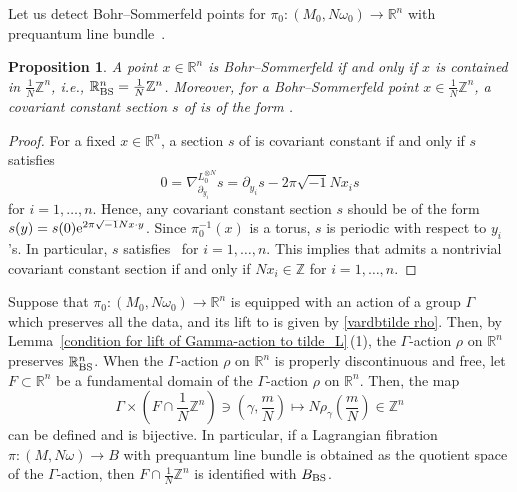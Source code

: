 \documentclass[pdftex]{sigma}
\numberwithin{equation}{section}
\newtheorem{Proposition}[Theorem]{Proposition}
 { \theoremstyle{definition}
\newtheorem{Definition}[Theorem]{Definition}
\newtheorem{Note}[Theorem]{Note}
\newtheorem{Example}[Theorem]{Example}
\newtheorem{Remark}[Theorem]{Remark} }
\newcommand{\R}{\mathbb{R}}
\newcommand{\Z}{\mathbb{Z}}
\renewcommand{\tilde}{\widetilde}
\newcommand{\vardbtilde}[1]{\tilde{\raisebox{0pt}[0.85\height]{$\tilde{#1}$}}}
\begin{document}
Let us detect Bohr--Sommerfeld points for $\pi_0\colon (M_0,N\omega_0)\to \R^n$ with prequantum line bundle~.
\begin{Proposition}\label{BS}
A point $x\in \R^n$ is Bohr--Sommerfeld if and only if $x$ is contained in $\frac{1}{N}\Z^n$, i.e., $\R^n_{\rm BS}=\frac{1}{N}\Z^n$. Moreover, for a Bohr--Sommerfeld point $x\in \frac{1}{N}\Z^n$, a covariant constant section $s$ of  is of the form .
\end{Proposition}
\begin{proof}
For a fixed $x\in \R^n$, a section $s$ of  is covariant constant if and only if $s$ satisfies
\[
0=\nabla^{L_0^{\otimes N}}_{\partial_{y_i}}s=\partial_{y_i}s-2\pi\sqrt{-1}Nx_is
\]
for $i=1,\ldots , n$. Hence, any covariant constant section $s$ should be of the form $s(y)=\smash{s(0){\rm e}^{2\pi\sqrt{-1}Nx\cdot y}}$. Since $\pi_0^{-1}(x)$ is a torus, $s$ is periodic with respect to $y_i$'s. In particular, $s$ satisfies~ for $i=1,\ldots , n$. This implies that  admits a nontrivial covariant constant section if and only if $Nx_i\in \Z$ for $i=1,\ldots , n$.
\end{proof}

\begin{Remark}\label{action preserves BS}
Suppose that $\pi_0\colon (M_0,N\omega_0)\to \R^n$ is equipped with an action of a group $\Gamma$ which preserves all the data, and its lift \smash{$\vardbtilde \rho$} to  is given by \eqref{vardbtilde rho}. Then, by Lemma~\ref{condition for lift of Gamma-action to tilde_L}\,(1), the $\Gamma$-action $\rho$ on $\R^n$ preserves $\R^n_{\rm BS}$. When the $\Gamma$-action $\rho$ on $\R^n$ is properly discontinuous and free, let $F\subset \R^n$ be a fundamental domain of the $\Gamma$-action $\rho$ on $\R^n$. Then, the map
\begin{equation}\label{Gamma times F}
\Gamma\times \left(F\cap \frac{1}{N}\Z^n\right)\ni \left(\gamma ,\dfrac{m}{N}\right)\mapsto N\rho_\gamma \left(\dfrac{m}{N}\right)\in \Z^n
\end{equation}
can be defined and is bijective. In particular, if a Lagrangian fibration $\pi\colon (M,N\omega)\to B$ with prequantum line bundle  is obtained as the quotient space of the $\Gamma$-action, then $F\cap \frac{1}{N}\Z^n$ is identified with $B_{\rm BS}$.
\end{Remark}
\end{document}
